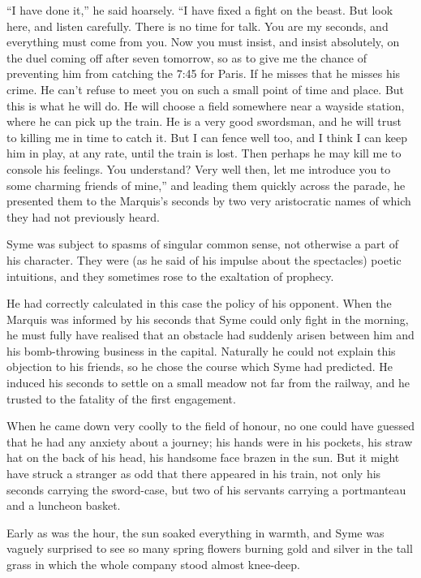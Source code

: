 “I have done it,” he said hoarsely. “I have fixed a fight on the beast. But look here, and listen carefully. There is no time for talk. You are my seconds, and everything must come from you. Now you must insist, and insist absolutely, on the duel coming off after seven tomorrow, so as to give me the chance of preventing him from catching the 7:45 for Paris. If he misses that he misses his crime. He can’t refuse to meet you on such a small point of time and place. But this is what he will do. He will choose a field somewhere near a wayside station, where he can pick up the train. He is a very good swordsman, and he will trust to killing me in time to catch it. But I can fence well too, and I think I can keep him in play, at any rate, until the train is lost. Then perhaps he may kill me to console his feelings. You understand? Very well then, let me introduce you to some charming friends of mine,” and leading them quickly across the parade, he presented them to the Marquis’s seconds by two very aristocratic names of which they had not previously heard.

Syme was subject to spasms of singular common sense, not otherwise a part of his character. They were (as he said of his impulse about the spectacles) poetic intuitions, and they sometimes rose to the exaltation of prophecy.

He had correctly calculated in this case the policy of his opponent. When the Marquis was informed by his seconds that Syme could only fight in the morning, he must fully have realised that an obstacle had suddenly arisen between him and his bomb-throwing business in the capital. Naturally he could not explain this objection to his friends, so he chose the course which Syme had predicted. He induced his seconds to settle on a small meadow not far from the railway, and he trusted to the fatality of the first engagement.

When he came down very coolly to the field of honour, no one could have guessed that he had any anxiety about a journey; his hands were in his pockets, his straw hat on the back of his head, his handsome face brazen in the sun. But it might have struck a stranger as odd that there appeared in his train, not only his seconds carrying the sword-case, but two of his servants carrying a portmanteau and a luncheon basket.

Early as was the hour, the sun soaked everything in warmth, and Syme was vaguely surprised to see so many spring flowers burning gold and silver in the tall grass in which the whole company stood almost knee-deep.

